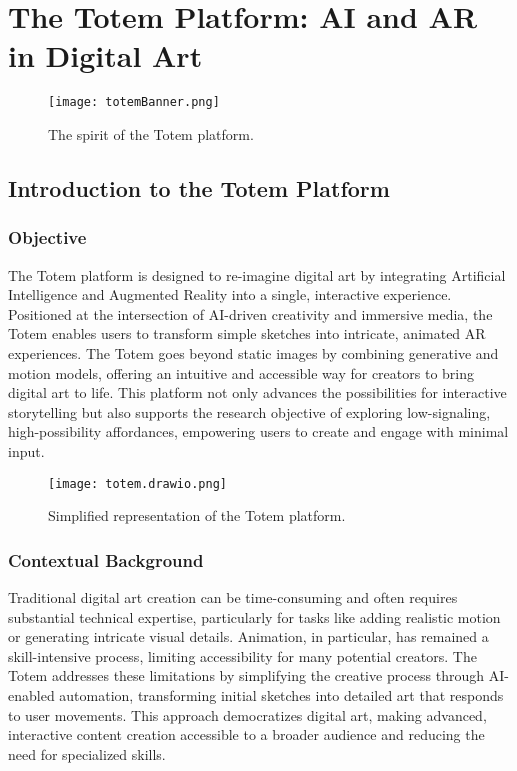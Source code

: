 \section{The Totem Platform: AI and AR in Digital Art}

\begin{figure}[!h]
    \centering
    \texttt{[image: totemBanner.png]}
    \caption{The spirit of the Totem platform.}
    \vspace{0.1cm}
    \label{fig:spiritofTotem}
\end{figure}

\subsection{ Introduction to the Totem Platform}

\subsubsection{Objective}

The Totem platform is designed to re-imagine digital art by integrating Artificial Intelligence and Augmented Reality into a single, interactive experience.
Positioned at the intersection of AI-driven creativity and immersive media, the Totem enables users to transform simple sketches into intricate, animated AR experiences.
The Totem goes beyond static images by combining generative and motion models, offering an intuitive and accessible way for creators to bring digital art to life.
This platform not only advances the possibilities for interactive storytelling but also supports the research objective of exploring low-signaling, high-possibility affordances, empowering users to create and engage with minimal input.

\begin{figure}[!h]
    \centering
    \texttt{[image: totem.drawio.png]}
    \caption{Simplified representation of the Totem platform.}
    \vspace{0.1cm}
    \label{fig:totemImage}
\end{figure}

\subsubsection{Contextual Background}
Traditional digital art creation can be time-consuming and often requires substantial technical expertise, particularly for tasks like adding realistic motion or generating intricate visual details.
Animation, in particular, has remained a skill-intensive process, limiting accessibility for many potential creators.
The Totem addresses these limitations by simplifying the creative process through AI-enabled automation, transforming initial sketches into detailed art that responds to user movements.
This approach democratizes digital art, making advanced, interactive content creation accessible to a broader audience and reducing the need for specialized skills.

